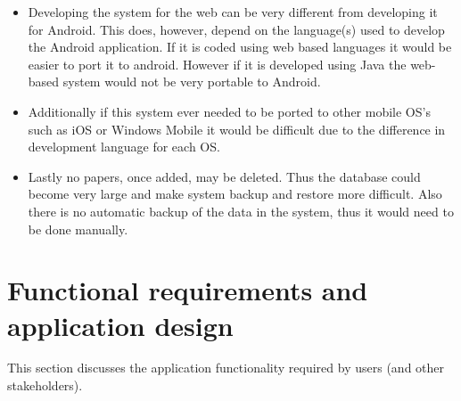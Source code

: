 \documentclass[a4paper,12pt]{article}
\begin{document}
\begin{itemize}
\item Developing the system for the web can be very different from developing it for Android. This does, however, depend on the language(s) used to develop the Android application. If it is coded using web based languages it would be easier to port it to android. However if it is developed using Java the web-based system would not be very portable to Android. 
\item Additionally if this system ever needed to be ported to other mobile OS's such as iOS or Windows Mobile it would be difficult due to the difference in development language for each OS.
\item Lastly no papers, once added, may be deleted. Thus the database could become very large and make system backup and restore more difficult. Also there is no automatic backup of the data in the system, thus it would need to be done manually. 
\end{itemize}

\newpage
\section{Functional requirements and application design}
This section discusses the application functionality required by users (and other stakeholders).

\end{document}
